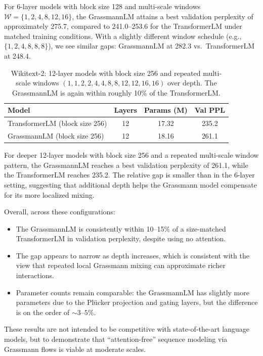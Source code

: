 \documentclass[11pt]{article}
\begin{document}
For 6-layer models with block size 128 and multi-scale windows $\mathcal{W} = \{1,2,4,8,12,16\}$, the GrassmannLM attains a best validation perplexity of approximately 275.7, compared to 241.0--253.6 for the TransformerLM under matched training conditions. With a slightly different window schedule (e.g., $\{1,2,4,8,8,8\}$), we see similar gaps: GrassmannLM at 282.3 vs.\ TransformerLM at 248.4.

\begin{table}[t]
\centering
\begin{tabular}{lccc}
\toprule
Model & Layers & Params (M) & Val PPL \\
\midrule
TransformerLM (block size 256) & 12 & 17.32 & 235.2 \\
GrassmannLM (block size 256) & 12 & 18.16 & 261.1 \\
\bottomrule
\end{tabular}
\caption{Wikitext-2: 12-layer models with block size 256 and repeated multi-scale windows $(1,1,2,2,4,4,8,8,12,12,16,16)$ over depth. The GrassmannLM is again within roughly 10\% of the TransformerLM.}
\label{tab:wikitext-12layer}
\end{table}

For deeper 12-layer models with block size 256 and a repeated multi-scale window pattern, the GrassmannLM reaches a best validation perplexity of 261.1, while the TransformerLM reaches 235.2. The relative gap is smaller than in the 6-layer setting, suggesting that additional depth helps the Grassmann model compensate for its more localized mixing.

Overall, across these configurations:

\begin{itemize}
    \item The GrassmannLM is consistently within 10--15\% of a size-matched TransformerLM in validation perplexity, despite using no attention.
    \item The gap appears to narrow as depth increases, which is consistent with the view that repeated local Grassmann mixing can approximate richer interactions.
    \item Parameter counts remain comparable: the GrassmannLM has slightly more parameters due to the Pl\"ucker projection and gating layers, but the difference is on the order of $\sim 3$--$5\%$.
\end{itemize}

These results are not intended to be competitive with state-of-the-art language models, but to demonstrate that ``attention-free'' sequence modeling via Grassmann flows is viable at moderate scales.
\end{document}
